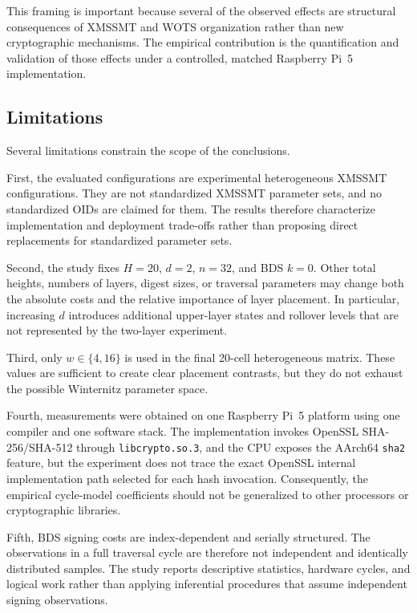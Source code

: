 \documentclass[pdflatex,sn-mathphys-num]{sn-jnl}
\begin{document}
This framing is important because several of the observed effects are
structural consequences of XMSSMT and WOTS organization rather than
new cryptographic mechanisms. The empirical contribution is the
quantification and validation of those effects under a controlled,
matched Raspberry Pi~5 implementation.

\subsection{Limitations}
\label{sec:limitations}

Several limitations constrain the scope of the conclusions.

First, the evaluated configurations are experimental heterogeneous
XMSSMT configurations. They are not standardized XMSSMT parameter sets,
and no standardized OIDs are claimed for them. The results therefore
characterize implementation and deployment trade-offs rather than
proposing direct replacements for standardized parameter sets.

Second, the study fixes $H=20$, $d=2$, $n=32$, and BDS $k=0$. Other
total heights, numbers of layers, digest sizes, or traversal parameters
may change both the absolute costs and the relative importance of
layer placement. In particular, increasing $d$ introduces additional
upper-layer states and rollover levels that are not represented by the
two-layer experiment.

Third, only $w\in\{4,16\}$ is used in the final 20-cell heterogeneous
matrix. These values are sufficient to create clear placement contrasts,
but they do not exhaust the possible Winternitz parameter space.

Fourth, measurements were obtained on one Raspberry Pi~5 platform using
one compiler and one software stack. The implementation invokes
OpenSSL SHA-256/SHA-512 through \texttt{libcrypto.so.3}, and the CPU
exposes the AArch64 \texttt{sha2} feature, but the experiment does not
trace the exact OpenSSL internal implementation path selected for each
hash invocation. Consequently, the empirical cycle-model coefficients
should not be generalized to other processors or cryptographic
libraries.

Fifth, BDS signing costs are index-dependent and serially structured.
The observations in a full traversal cycle are therefore not
independent and identically distributed samples. The study reports
descriptive statistics, hardware cycles, and logical work rather than
applying inferential procedures that assume independent signing
observations.
\end{document}
